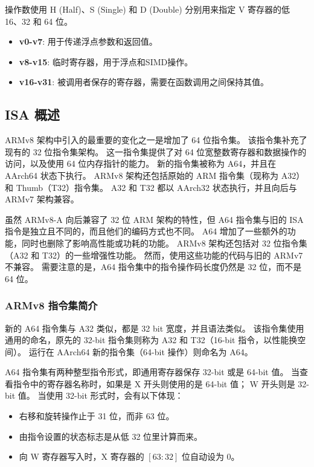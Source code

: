 操作数使用 H (Half)、S (Single) 和 D (Double) 分别用来指定 V 寄存器的低 16、32 和 64 位。

\begin{itemize}
  \item
    \textbf{v0-v7}: 用于传递浮点参数和返回值。
  \item
    \textbf{v8-v15}: 临时寄存器，用于浮点和SIMD操作。
  \item
    \textbf{v16-v31}: 被调用者保存的寄存器，需要在函数调用之间保持其值。
\end{itemize}

\subsection{ISA 概述}

ARMv8 架构中引入的最重要的变化之一是增加了 64 位指令集。
该指令集补充了现有的 32 位指令集架构。
这一指令集提供了对 64 位宽整数寄存器和数据操作的访问，以及使用 64 位内存指针的能力。
新的指令集被称为 A64，并且在 AArch64 状态下执行。
ARMv8 架构还包括原始的 ARM 指令集（现称为 A32）和 Thumb（T32）指令集。
A32 和 T32 都以 AArch32 状态执行，并且向后与 ARMv7 架构兼容。

虽然 ARMv8-A 向后兼容了 32 位 ARM 架构的特性，但 A64 指令集与旧的 ISA 指令是独立且不同的，而且他们的编码方式也不同。
A64 增加了一些额外的功能，同时也删除了影响高性能或功耗的功能。
ARMv8 架构还包括对 32 位指令集（A32 和 T32）的一些增强性功能。
然而，使用这些功能的代码与旧的 ARMv7 不兼容。
需要注意的是，A64 指令集中的指令操作码长度仍然是 32 位，而不是 64 位。

\subsubsection{ARMv8 指令集简介}

新的 A64 指令集与 A32 类似，都是 32 bit 宽度，并且语法类似。
该指令集使用通用的命名，原先的 32-bit 指令集则称为 A32 和 T32（16-bit 指令，以性能换空间）。
运行在 AArch64 新的指令集（64-bit 操作）则命名为 A64。

A64 指令集有两种整型指令形式，即通用寄存器保存 32-bit 或是 64-bit 值。
当查看指令中的寄存器名称时，如果是 X 开头则使用的是 64-bit 值；
W 开头则是 32-bit 值。
当使用 32-bit 形式时，会有以下体现：
\begin{itemize}
  \item 右移和旋转操作止于 31 位，而非 63 位。
  \item 由指令设置的状态标志是从低 32 位里计算而来。
  \item 向 W 寄存器写入时，X 寄存器的 $[63:32]$ 位自动设为 0。
\end{itemize}

